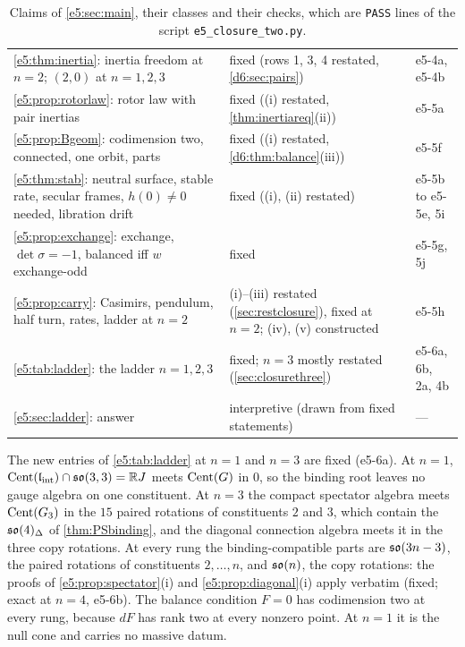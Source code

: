 \begin{table}[htbp]
\begin{tabular}{@{}>{\raggedright\arraybackslash}p{8.0cm}>{\raggedright\arraybackslash}p{4.7cm}>{\raggedright\arraybackslash}p{2.1cm}@{}}
\cref{e5:thm:inertia}: inertia freedom at $n=2$; $(2,0)$ at $n=1,2,3$ & fixed (rows 1, 3, 4 restated, \cref{d6:sec:pairs}) & e5-4a, e5-4b\\
\cref{e5:prop:rotorlaw}: rotor law with pair inertias & fixed ((i) restated, \cref{thm:inertiareq}(ii)) & e5-5a\\
\cref{e5:prop:Bgeom}: codimension two, connected, one orbit, parts & fixed ((i) restated, \cref{d6:thm:balance}(iii)) & e5-5f\\
\cref{e5:thm:stab}: neutral surface, stable rate, secular frames, $h(0)\neq0$ needed, libration drift & fixed ((i), (ii) restated) & e5-5b to e5-5e, 5i\\
\cref{e5:prop:exchange}: exchange, $\det\sigma=-1$, balanced iff $w$ exchange-odd & fixed & e5-5g, 5j\\
\cref{e5:prop:carry}: Casimirs, pendulum, half turn, rates, ladder at $n=2$ & (i)--(iii) restated (\cref{sec:restclosure}), fixed at $n=2$; (iv), (v) constructed & e5-5h\\
\cref{e5:tab:ladder}: the ladder $n=1,2,3$ & fixed; $n=3$ mostly restated (\cref{sec:closurethree}) & e5-6a, 6b, 2a, 4b\\
\cref{e5:sec:ladder}: answer & interpretive (drawn from fixed statements) & ---\\
\bottomrule
\end{tabular}
\caption{Claims of \cref{e5:sec:main}, their classes and their checks, which are \texttt{PASS} lines of the script
\texttt{e5\_closure\_two.py}.}
\label{e5:tab:claims}
\end{table}

The new entries of \cref{e5:tab:ladder} at $n=1$ and $n=3$ are fixed (e5-6a). At $n=1$, $\operatorname{Cent}(\mathfrak l_{\rm int})\cap\mathfrak{so}(3,3)=\mathbb{R} J$ meets $\operatorname{Cent}(G)$ in $0$, so the
binding root leaves no gauge algebra on one constituent. At $n=3$ the compact spectator algebra meets $\operatorname{Cent}(G_3)$ in the $15$ paired rotations of
constituents $2$ and $3$, which contain the $\mathfrak{so}(4)_\Delta$ of \cref{thm:PSbinding}, and the diagonal connection algebra meets it in the three copy
rotations. At every rung the binding-compatible parts are $\mathfrak{so}(3n-3)$, the paired rotations of constituents $2,\dots,n$, and $\mathfrak{so}(n)$, the copy
rotations: the proofs of \cref{e5:prop:spectator}(i) and \cref{e5:prop:diagonal}(i) apply verbatim (fixed; exact at $n=4$, e5-6b). The balance condition $F=0$ has codimension two at every rung, because $dF$
has rank two at every nonzero point. At $n=1$ it is the null cone and carries no massive datum.

